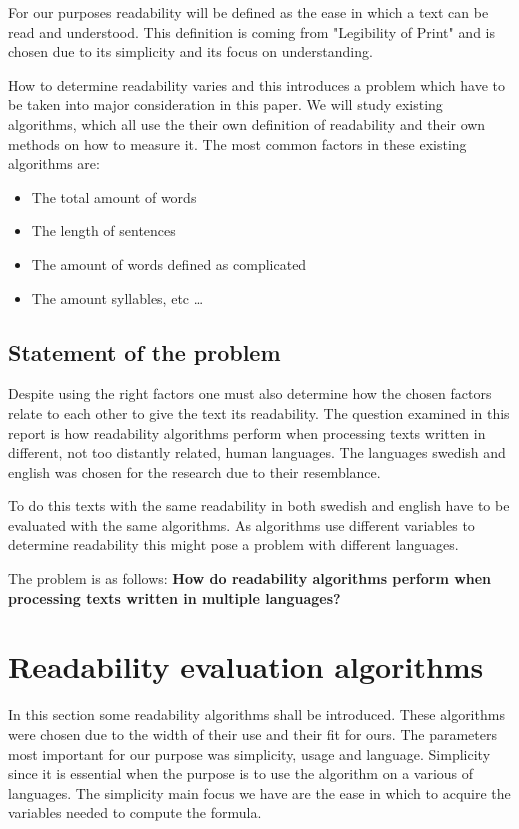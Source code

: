 \documentclass[a4paper]{article}
\begin{document}
For our purposes readability will be defined as the ease in which a text can be read and understood. This definition is coming from "Legibility of Print" \cite{tinker63} and is chosen due to its simplicity and its focus on understanding. 

How to determine readability varies and this introduces a problem which have to be taken into major consideration in this paper. We will study existing algorithms, which all use the their own definition of readability and their own methods on how to measure it. The most common factors in these existing algorithms are: 

\begin{itemize}
    \item The total amount of words
    \item The length of sentences
    \item The amount of words defined as complicated
    \item The amount syllables, etc \ldots
\end{itemize}

\subsection{Statement of the problem}
Despite  using  the  right  factors  one  must  also determine how the chosen factors relate to each other to give the text its readability. The question examined in this report is how readability algorithms perform when processing texts written in different, not too distantly related, human languages. The languages swedish and english was chosen for the research due to their resemblance. 

To do this texts with the same readability in both swedish and english have to be evaluated with the same algorithms. As algorithms use different variables to determine readability this might pose a problem with different languages.

The problem is as follows:
\newline
\newline
\textbf{How do readability algorithms perform when processing texts written in multiple languages?}
\section{Readability evaluation algorithms}

In this section some readability algorithms shall be introduced. These algorithms were chosen due to the width of their use and their fit for ours. The parameters most important for our purpose was simplicity, usage and language. Simplicity since it is essential when the purpose is to use the algorithm on a various of languages. The simplicity main focus we have are the ease in which to acquire the variables needed to compute the formula.
\end{document}
